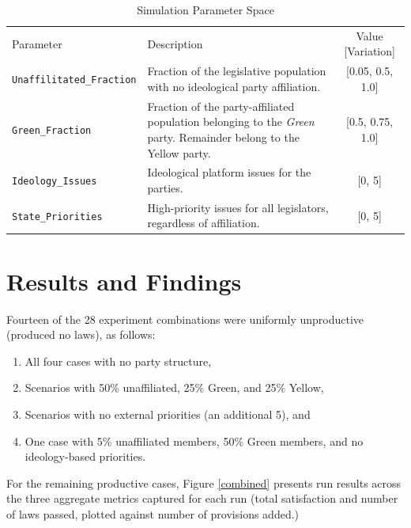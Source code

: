 \documentclass[pdftex,12pt,oribibl]{llncs}
\begin{document}
\begin{table}[htp]
 \caption{Simulation Parameter Space}
 \begin{tabular}{lp{2.25in}c}
 \hline\noalign{\smallskip}
 Parameter & Description & Value [Variation] \\
 \noalign{\smallskip}
 \hline
 \noalign{\smallskip}
 \texttt{Unaffilitated\_Fraction} & Fraction of the legislative population with no ideological party  affiliation. & [0.05, 0.5, 1.0] \\
 \texttt{Green\_Fraction} & Fraction of the party-affiliated population belonging to the \textit{Green} party. Remainder belong to the Yellow party. & [0.5, 0.75, 1.0] \\
 \texttt{Ideology\_Issues} & Ideological platform issues for the parties. & [0, 5] \\
 \texttt{State\_Priorities} & High-priority issues for all legislators, regardless of affiliation. & [0, 5] \\
 \hline
 \end{tabular}
 \label{params}
\end{table}


\section{Results and Findings}
%
Fourteen of the 28 experiment combinations were uniformly unproductive (produced no laws), as follows:
\begin{enumerate}
\item All four cases with no party structure,
\item Scenarios with 50\% unaffiliated, 25\% Green, and 25\% Yellow,
\item Scenarios with no external priorities (an additional 5), and
\item One case with 5\% unaffiliated members, 50\% Green members, and no ideology-based priorities.
\end{enumerate}
For the remaining productive cases, Figure \ref{combined} presents run results across the three aggregate metrics captured for each run (total satisfaction and number of laws passed, plotted against number of provisions added.) 
\end{document}

